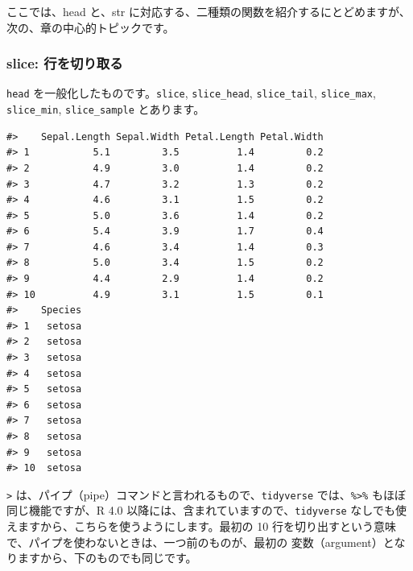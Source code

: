 \documentclass[
  xelatex, ja=standard]{bxjsbook}
\theoremstyle{definition}
\theoremstyle{definition}
\theoremstyle{definition}
\theoremstyle{definition}
\theoremstyle{remark}
\begin{document}
ここでは、head と、str に対応する、二種類の関数を紹介するにとどめますが、次の、章の中心的トピックです。

\hypertarget{slice-ux884cux3092ux5207ux308aux53d6ux308b}{%
\subsubsection{slice: 行を切り取る}\label{slice-ux884cux3092ux5207ux308aux53d6ux308b}}

\texttt{head} を一般化したものです。\texttt{slice}, \texttt{slice\_head}, \texttt{slice\_tail}, \texttt{slice\_max}, \texttt{slice\_min}, \texttt{slice\_sample} とあります。

\begin{verbatim}
#>    Sepal.Length Sepal.Width Petal.Length Petal.Width
#> 1           5.1         3.5          1.4         0.2
#> 2           4.9         3.0          1.4         0.2
#> 3           4.7         3.2          1.3         0.2
#> 4           4.6         3.1          1.5         0.2
#> 5           5.0         3.6          1.4         0.2
#> 6           5.4         3.9          1.7         0.4
#> 7           4.6         3.4          1.4         0.3
#> 8           5.0         3.4          1.5         0.2
#> 9           4.4         2.9          1.4         0.2
#> 10          4.9         3.1          1.5         0.1
#>    Species
#> 1   setosa
#> 2   setosa
#> 3   setosa
#> 4   setosa
#> 5   setosa
#> 6   setosa
#> 7   setosa
#> 8   setosa
#> 9   setosa
#> 10  setosa
\end{verbatim}

\texttt{\textbar{}\textgreater{}} は、パイプ（pipe）コマンドと言われるもので、\texttt{tidyverse} では、\texttt{\%\textgreater{}\%} もほぼ同じ機能ですが、R 4.0 以降には、含まれていますので、\texttt{tidyverse} なしでも使えますから、こちらを使うようにします。最初の 10 行を切り出すという意味で、パイプを使わないときは、一つ前のものが、最初の 変数（argument）となりますから、下のものでも同じです。
\end{document}
